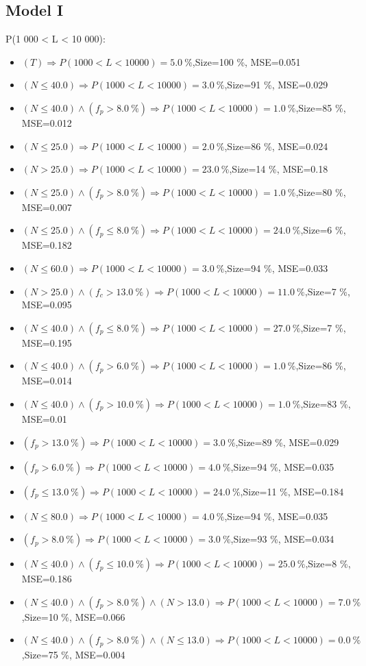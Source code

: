 \documentclass[numbered]{CSL}
\begin{document}
\subsection{Model I}
P(1 000 < L < 10 000):
\begin{itemize}
\item $(T) \Rightarrow P(1 000 < L < 10 000) = 5.0~\%$,\hfill Size=100 \%, MSE=0.051
\item $(N \leq 40.0) \Rightarrow P(1 000 < L < 10 000) = 3.0~\%$,\hfill Size=91 \%, MSE=0.029
\item $(N \leq 40.0) \land (f_p > 8.0~\%) \Rightarrow P(1 000 < L < 10 000) = 1.0~\%$,\hfill Size=85 \%, MSE=0.012
\item $(N \leq 25.0) \Rightarrow P(1 000 < L < 10 000) = 2.0~\%$,\hfill Size=86 \%, MSE=0.024
\item $(N > 25.0) \Rightarrow P(1 000 < L < 10 000) = 23.0~\%$,\hfill Size=14 \%, MSE=0.18
\item $(N \leq 25.0) \land (f_p > 8.0~\%) \Rightarrow P(1 000 < L < 10 000) = 1.0~\%$,\hfill Size=80 \%, MSE=0.007
\item $(N \leq 25.0) \land (f_p \leq 8.0~\%) \Rightarrow P(1 000 < L < 10 000) = 24.0~\%$,\hfill Size=6 \%, MSE=0.182
\item $(N \leq 60.0) \Rightarrow P(1 000 < L < 10 000) = 3.0~\%$,\hfill Size=94 \%, MSE=0.033
\item $(N > 25.0) \land (f_c > 13.0~\%) \Rightarrow P(1 000 < L < 10 000) = 11.0~\%$,\hfill Size=7 \%, MSE=0.095
\item $(N \leq 40.0) \land (f_p \leq 8.0~\%) \Rightarrow P(1 000 < L < 10 000) = 27.0~\%$,\hfill Size=7 \%, MSE=0.195
\item $(N \leq 40.0) \land (f_p > 6.0~\%) \Rightarrow P(1 000 < L < 10 000) = 1.0~\%$,\hfill Size=86 \%, MSE=0.014
\item $(N \leq 40.0) \land (f_p > 10.0~\%) \Rightarrow P(1 000 < L < 10 000) = 1.0~\%$,\hfill Size=83 \%, MSE=0.01
\item $(f_p > 13.0~\%) \Rightarrow P(1 000 < L < 10 000) = 3.0~\%$,\hfill Size=89 \%, MSE=0.029
\item $(f_p > 6.0~\%) \Rightarrow P(1 000 < L < 10 000) = 4.0~\%$,\hfill Size=94 \%, MSE=0.035
\item $(f_p \leq 13.0~\%) \Rightarrow P(1 000 < L < 10 000) = 24.0~\%$,\hfill Size=11 \%, MSE=0.184
\item $(N \leq 80.0) \Rightarrow P(1 000 < L < 10 000) = 4.0~\%$,\hfill Size=94 \%, MSE=0.035
\item $(f_p > 8.0~\%) \Rightarrow P(1 000 < L < 10 000) = 3.0~\%$,\hfill Size=93 \%, MSE=0.034
\item $(N \leq 40.0) \land (f_p \leq 10.0~\%) \Rightarrow P(1 000 < L < 10 000) = 25.0~\%$,\hfill Size=8 \%, MSE=0.186
\item $(N \leq 40.0) \land (f_p > 8.0~\%) \land (N > 13.0) \Rightarrow P(1 000 < L < 10 000) = 7.0~\%$,\hfill Size=10 \%, MSE=0.066
\item $(N \leq 40.0) \land (f_p > 8.0~\%) \land (N \leq 13.0) \Rightarrow P(1 000 < L < 10 000) = 0.0~\%$,\hfill Size=75 \%, MSE=0.004
\end{itemize}
\end{document}
